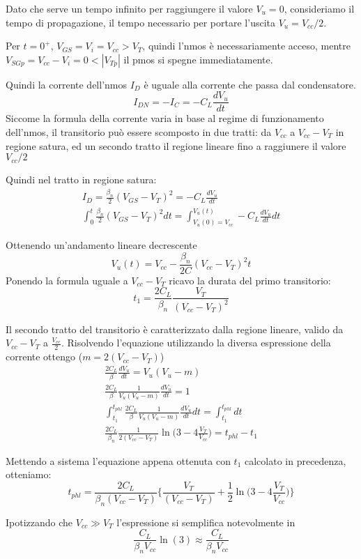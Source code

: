 \documentclass[../template]{subfiles}
\begin{document}
Dato che serve un tempo infinito per raggiungere il valore $V_u = 0$, consideriamo il tempo di propagazione, il tempo necessario per portare l'uscita $V_u = V_{cc}/2$.

\begin{tcolorbox}
    Per $t = 0^+$, $V_{GS} = V_i = V_{cc} > V_T$, quindi l'nmos è necessariamente acceso, mentre
    $V_{SGp} = V_{cc} - V_i = 0 < |V_{Tp}|$ il pmos si spegne immediatamente.

    Quindi la corrente dell'nmos $I_D$ è uguale alla corrente che passa dal condensatore.
    \[
        I_{DN} = - I_C = - C_L \frac{dV_u}{dt}
    \]
    Siccome la formula della corrente varia in base al regime di funzionamento dell'nmos, il transitorio può essere scomposto in due tratti:
    da $V_{cc}$ a $V_{cc} - V_T$ in regione satura, ed un secondo tratto il regione lineare fino a raggiunere il valore $V_{cc} /2$


    Quindi nel tratto in regione satura:
    \begin{align*}
        I_D = \frac{\beta_n}{2}(V_{GS} - V_T)^2 = - C_L \frac{dV_u}{dt}
        \\
        \int^t_0 \frac{\beta_n}{2}(V_{GS} - V_T)^2 dt = \int^{V_u(t)}_{V_u(0) = V_{cc}} - C_L \frac{dV_u}{dt} dt
    \end{align*}

    Ottenendo un'andamento lineare decrescente
    \[
        V_u(t) = V_{cc} - \frac{\beta_n}{2C}(V_{cc} - V_T)^2t
    \]
    Ponendo la formula uguale a $V_{cc} - V_T$ ricavo la durata del primo transitorio:
    \[
        t_1 = \frac{2 C_L}{\beta_n} \frac{V_T}{(V_{cc} - V_T)^2}
    \]

    Il secondo tratto del transitorio è caratterizzato dalla regione lineare, valido da $V_{cc} - V_T$ a $\frac{V_{cc}}{2}$.
    Risolvendo l'equazione utilizzando la diversa espressione della corrente ottengo ($m = 2(V_{cc} - V_T)$)
    \begin{align*}
        \frac{2 C_L}{\beta} \frac{dV_u}{dt} = V_u (V_u - m)
        \\
        \frac{2 C_L}{\beta} \frac{1}{V_u (V_u - m)}\frac{dV_u}{dt} = 1
        \\
        \int_{t_1}^{t_{phl}}\frac{2 C_L}{\beta} \frac{1}{V_u (V_u - m)}\frac{dV_u}{dt} dt= \int_{t_1}^{t_{phl}} dt
        \\
        \frac{2 C_L}{\beta_n} \frac{1}{2(V_{cc} - V_T)} \ln \big(3 - 4\frac{V_T}{V_{cc}}\big) = t_{phl} - t_1
    \end{align*}

    Mettendo a sistema l'equazione appena ottenuta con $t_1$ calcolato in precedenza, otteniamo:
    \[
        t_{phl} = \frac{2 C_L}{\beta_n (V_{cc} - V_T)} \big\{
        \frac{V_T}{(V_{cc} - V_T)} + \frac{1}{2} \ln \big( 3 - 4 \frac{V_T}{V_{cc}}\big)\big
        \}
    \]

\end{tcolorbox}
Ipotizzando che $V_{cc} \gg V_T$ l'espressione si semplifica notevolmente in
\[
    \frac{C_L}{\beta_n V_{cc}} \ln(3) \approx \frac{C_L}{\beta_n V_{cc}}
\]
\end{document}
